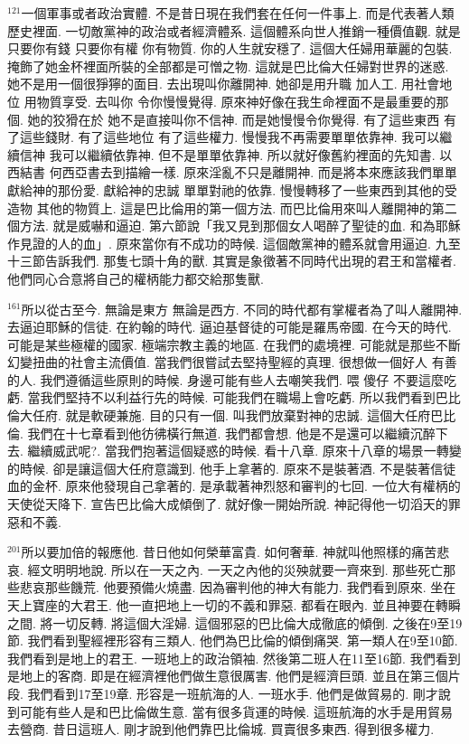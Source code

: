 \documentclass{book}
\begin{document}
$^{121}$一個軍事或者政治實體.
不是昔日現在我們套在任何一件事上.
而是代表著人類歷史裡面.
一切敵黨神的政治或者經濟體系.
這個體系向世人推銷一種價值觀.
就是只要你有錢 只要你有權 你有物質.
你的人生就安穩了.
這個大任婦用華麗的包裝.
掩飾了她金杯裡面所裝的全部都是可憎之物.
這就是巴比倫大任婦對世界的迷惑.
她不是用一個很猙獰的面目.
去出現叫你離開神.
她卻是用升職 加人工.
用社會地位 用物質享受.
去叫你 令你慢慢覺得.
原來神好像在我生命裡面不是最重要的那個.
她的狡猾在於 她不是直接叫你不信神.
而是她慢慢令你覺得.
有了這些東西 有了這些錢財.
有了這些地位 有了這些權力.
慢慢我不再需要單單依靠神.
我可以繼續信神 我可以繼續依靠神.
但不是單單依靠神.
所以就好像舊約裡面的先知書.
以西結書 何西亞書去到描繪一樣.
原來淫亂不只是離開神.
而是將本來應該我們單單獻給神的那份愛.
獻給神的忠誠 單單對祂的依靠.
慢慢轉移了一些東西到其他的受造物 其他的物質上.
這是巴比倫用的第一個方法.
而巴比倫用來叫人離開神的第二個方法.
就是威嚇和逼迫.
第六節說「我又見到那個女人喝醉了聖徒的血.
和為耶穌作見證的人的血」.
原來當你有不成功的時候.
這個敵黨神的體系就會用逼迫.
九至十三節告訴我們.
那隻七頭十角的獸.
其實是象徵著不同時代出現的君王和當權者.
他們同心合意將自己的權柄能力都交給那隻獸.

$^{161}$所以從古至今.
無論是東方 無論是西方.
不同的時代都有掌權者為了叫人離開神.
去逼迫耶穌的信徒.
在約翰的時代.
逼迫基督徒的可能是羅馬帝國.
在今天的時代.
可能是某些極權的國家.
極端宗教主義的地區.
在我們的處境裡.
可能就是那些不斷幻變扭曲的社會主流價值.
當我們很嘗試去堅持聖經的真理.
很想做一個好人 有善的人.
我們遵循這些原則的時候.
身邊可能有些人去嘲笑我們.
喂 傻仔 不要這麼吃虧.
當我們堅持不以利益行先的時候.
可能我們在職場上會吃虧.
所以我們看到巴比倫大任府.
就是軟硬兼施.
目的只有一個.
叫我們放棄對神的忠誠.
這個大任府巴比倫.
我們在十七章看到他彷彿橫行無道.
我們都會想.
他是不是還可以繼續沉醉下去.
繼續威武呢?.
當我們抱著這個疑惑的時候.
看十八章.
原來十八章的場景一轉變的時候.
卻是讓這個大任府意識到.
他手上拿著的.
原來不是裝著酒.
不是裝著信徒血的金杯.
原來他發現自己拿著的.
是承載著神烈怒和審判的七回.
一位大有權柄的天使從天降下.
宣告巴比倫大成傾倒了.
就好像一開始所說.
神記得他一切滔天的罪惡和不義.

$^{201}$所以要加倍的報應他.
昔日他如何榮華富貴.
如何奢華.
神就叫他照樣的痛苦悲哀.
經文明明地說.
所以在一天之內.
一天之內他的災殃就要一齊來到.
那些死亡那些悲哀那些饑荒.
他要預備火燒盡.
因為審判他的神大有能力.
我們看到原來.
坐在天上寶座的大君王.
他一直把地上一切的不義和罪惡.
都看在眼內.
並且神要在轉瞬之間.
將一切反轉.
將這個大淫婦.
這個邪惡的巴比倫大成徹底的傾倒.
之後在9至19節.
我們看到聖經裡形容有三類人.
他們為巴比倫的傾倒痛哭.
第一類人在9至10節.
我們看到是地上的君王.
一班地上的政治領袖.
然後第二班人在11至16節.
我們看到是地上的客商.
即是在經濟裡他們做生意很厲害.
他們是經濟巨頭.
並且在第三個片段.
我們看到17至19章.
形容是一班航海的人.
一班水手.
他們是做貿易的.
剛才說到可能有些人是和巴比倫做生意.
當有很多貨運的時候.
這班航海的水手是用貿易去營商.
昔日這班人.
剛才說到他們靠巴比倫城.
買賣很多東西.
得到很多權力.
\end{document}
